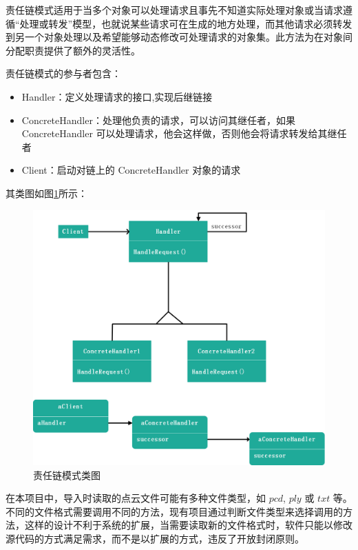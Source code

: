 \documentclass[article]{BJTU-thesis}
\begin{document}
	责任链模式适用于当多个对象可以处理请求且事先不知道实际处理对象或当请求遵循“处理或转发”模型，也就说某些请求可在生成的地方处理，而其他请求必须转发到另一个对象处理以及希望能够动态修改可处理请求的对象集。此方法为在对象间分配职责提供了额外的灵活性。
	
	责任链模式的参与者包含：
	\begin{itemize}
		\item Handler：定义处理请求的接口,实现后继链接
	    \item  ConcreteHandler：处理他负责的请求，可以访问其继任者，如果 ConcreteHandler 可以处理请求，他会这样做，否则他会将请求转发给其继任者
		\item Client：启动对链上的 ConcreteHandler 对象的请求
	\end{itemize}
	
	其类图如图\ref{fig:fig10}所示：
	\begin{figure}[!htbp]
		\centering
		\includegraphics[scale=0.45]{20.png}
		\caption{责任链模式类图}
		\label{fig:fig10}
	\end{figure}
\newpage
	在本项目中，导入时读取的点云文件可能有多种文件类型，如 $pcd$, $ply$ 或 $txt$ 等。不同的文件格式需要调用不同的方法，现有项目通过判断文件类型来选择调用的方法，这样的设计不利于系统的扩展，当需要读取新的文件格式时，软件只能以修改源代码的方式满足需求，而不是以扩展的方式，违反了开放封闭原则。
	
\end{document}
